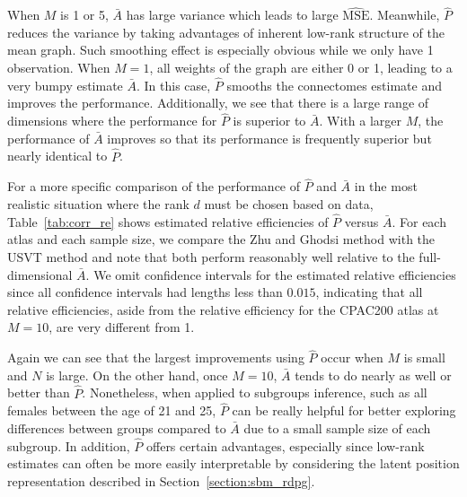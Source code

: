 \documentclass[10pt,letterpaper]{article}
\renewcommand{\hat}{\widehat}
\begin{document}
When $M$ is 1 or 5, $\bar{A}$ has large variance which leads to large $\hat{\mathrm{MSE}}$. Meanwhile, $\hat{P}$ reduces the variance by taking advantages of inherent low-rank structure of the mean graph. Such smoothing effect is especially obvious while we only have 1 observation. When $M = 1$, all weights of the graph are either 0 or 1, leading to a very bumpy estimate $\bar{A}$. In this case, $\hat{P}$ smooths the connectomes estimate and improves the performance.
Additionally, we see that there is a large range of dimensions where the performance for $\hat{P}$ is superior to $\bar{A}$. 
With a larger $M$, the performance of $\bar{A}$ improves so that its performance is frequently superior but nearly identical to $\hat{P}$.

For a more specific comparison of the performance of $\hat{P}$ and $\bar{A}$ in the most realistic situation where the rank $d$ must be chosen based on data, Table~\ref{tab:corr_re} shows estimated relative efficiencies of $\hat{P}$ versus $\bar{A}$.
For each atlas and each sample size, we compare the Zhu and Ghodsi method \citep{zhu2006automatic} with the USVT method \citep{chatterjee2015matrix} and note that both perform reasonably well relative to the full-dimensional $\bar{A}$.
We omit confidence intervals for the estimated relative efficiencies since all confidence intervals had lengths less than $0.015$, indicating that all relative efficiencies, aside from the relative efficiency for the CPAC200 atlas at $M=10$, are very different from 1.

Again we can see that the largest improvements using $\hat{P}$ occur when $M$ is small and $N$ is large. 
On the other hand, once $M=10$, $\bar{A}$ tends to do nearly as well or better than $\hat{P}$. 
Nonetheless, when applied to subgroups inference, such as all females between the age of 21 and 25, $\hat{P}$ can be really helpful for better exploring differences between groups compared to $\bar{A}$ due to a small sample size of each subgroup.
In addition, $\hat{P}$ offers certain advantages, especially since low-rank estimates can often be more easily interpretable by considering the latent position representation described in Section~\ref{section:sbm_rdpg}.
\end{document}
